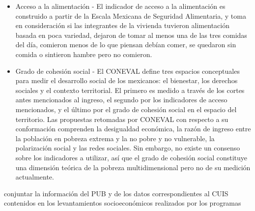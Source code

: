 \begin{itemize}
    \item Acceso a la alimentación - El indicador de acceso a la alimentación es construido a partir de la Escala Mexicana de Seguridad Alimentaria, y toma en consideración si las integrantes de la vivienda tuvieron alimentación basada en poca variedad, dejaron de tomar al menos una de las tres comidas del día, comieron menos de lo que piensan debían comer, se quedaron sin comida o sintieron hambre pero no comieron.
    \item Grado de cohesión social - El CONEVAL define tres espacios conceptuales para medir el desarrollo social de los mexicanos: el bienestar, los derechos sociales y el contexto territorial. El primero es medido a través de los cortes antes mencionados al ingreso, el segundo por los indicadores de acceso mencionados, y el último por el grado de cohesión social en el espacio del territorio. Las propuestas retomadas por CONEVAL con respecto a su conformación comprenden la desigualdad económica, la razón de ingreso entre la población en pobreza extrema y la no pobre y no vulnerable, la polarización social y las redes sociales. Sin embargo, no existe un consenso sobre los indicadores a utilizar, así que el grado de cohesión social constituye una dimensión teórica de la pobreza multidimensional pero no de su medición actualmente.
\end{itemize}

conjuntar la información del PUB y de los datos correspondientes al CUIS contenidos en los levantamientos socioeconómicos realizados por los programas
